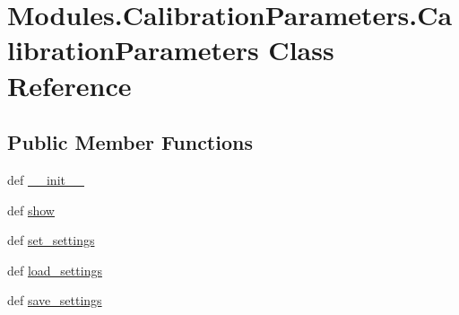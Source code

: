 \hypertarget{classModules_1_1CalibrationParameters_1_1CalibrationParameters}{\section{Modules.\-Calibration\-Parameters.\-Calibration\-Parameters Class Reference}
\label{classModules_1_1CalibrationParameters_1_1CalibrationParameters}
}
\subsection*{Public Member Functions}
\begin{DoxyCompactItemize}
\item 
def \hyperlink{classModules_1_1CalibrationParameters_1_1CalibrationParameters_a95c95f05684d72250bddf7a46688e363}{\-\_\-\-\_\-init\-\_\-\-\_\-}
\item 
def \hyperlink{classModules_1_1CalibrationParameters_1_1CalibrationParameters_adb9ba4e01f0f198c0396c33cc2a74c8a}{show}
\item 
def \hyperlink{classModules_1_1CalibrationParameters_1_1CalibrationParameters_a40b7ae90349f9177ddaa1ebb576e8ac1}{set\-\_\-settings}
\item 
def \hyperlink{classModules_1_1CalibrationParameters_1_1CalibrationParameters_ac0a7bad8db5e7533f1d79c9b53718669}{load\-\_\-settings}
\item 
def \hyperlink{classModules_1_1CalibrationParameters_1_1CalibrationParameters_aaa58de4b3265a493e7572875e25bbf6e}{save\-\_\-settings}
\end{DoxyCompactItemize}
